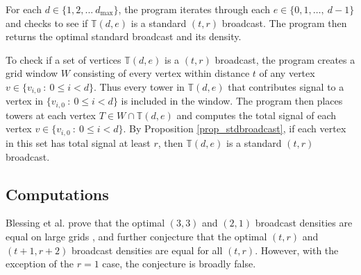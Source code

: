 \documentclass[12pt]{amsart}
\newcounter{x}
\newcounter{y}
\newcounter{x2}
\newcounter{y2}
\newcommand{\T}{
    \mathbb{T}
}
\begin{document}
For each $d \in \{1,2, ... \ d_{\max}\}$, the program iterates through each $e \in \{0,1, \ldots,  \ d-1\}$ and checks to see if $\T(d,e)$ is a standard $(t,r)$ broadcast. The program then returns the optimal standard broadcast and its density.

To check if a set of vertices $\T(d,e)$ is a $(t,r)$ broadcast, the program creates a grid window $W$ consisting of every vertex within distance $t$ of any vertex $v \in \{v_{i,0} \ : \ 0\leq i<d\}$. Thus every tower in $\T(d,e)$ that contributes signal to a vertex in $\{v_{i,0} \ : \ 0\leq i<d\}$ is included in the window. The program then places towers at each vertex $T \in W\cap\T(d,e)$ and computes the total signal of each vertex $v \in \{v_{i,0} \ : \ 0\leq i<d\}$. By Proposition \ref{prop_stdbroadcast}, if each vertex in this set has total signal at least $r$, then $\T(d,e)$ is a standard $(t,r)$ broadcast.

\subsection{Computations}\label{sec:ex}
Blessing et al. prove that the optimal $(3,3)$ and $(2,1)$ broadcast densities are equal on large grids \cite{blessing2015t}, and further conjecture that the optimal $(t,r)$ and $(t+1,r+2)$ broadcast densities are equal for all $(t,r)$. However, with the exception of the $r=1$ case, the conjecture is broadly false.
\end{document}
